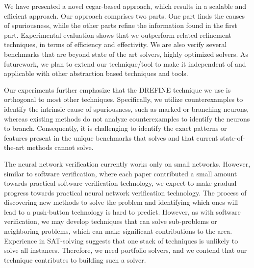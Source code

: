 We have presented a novel cegar-based approach, which results in a scalable and efficient approach.  
Our approach comprises two parts. One part finds the causes of spuriousness, 
while the other parts refine  the information found in the first part. 
Experimental evaluation shows that we outperform related refinement techniques, in terms of efficiency and effectivity. 
We are also verify several benchmarks that are beyond state of the art solvers, highly optimized solvers.
As futurework, we plan to extend our technique/tool to make it independent of \deeppoly{} and applicable with other 
abstraction based techniques and tools. %

Our experiments further emphasize that the DREFINE technique we use is orthogonal to most other techniques. 
Specifically, we utilize counterexamples to identify the intrinsic cause of spuriousness, 
such as marked or branching neurons, whereas existing methods do not analyze counterexamples to identify the neurons to branch. 
Consequently, it is challenging to identify the exact patterns or features present in the unique benchmarks that 
\drefine{} solves and that current state-of-the-art methods cannot solve.

The neural network verification currently works only on small networks. However, similar to software verification, 
where each paper contributed a small amount towards practical software verification technology, 
we expect to make gradual progress towards practical neural network verification technology. 
The process of discovering new methods to solve the problem and identifying which ones will lead 
to a push-button technology is hard to predict. 
However, as with software verification, we may develop techniques that can solve sub-problems or neighboring problems, 
which can make significant contributions to the area.
Experience in SAT-solving suggests that one stack of techniques is unlikely to solve all instances. 
Therefore, we need portfolio solvers, and we contend that our technique contributes to building such a solver.


